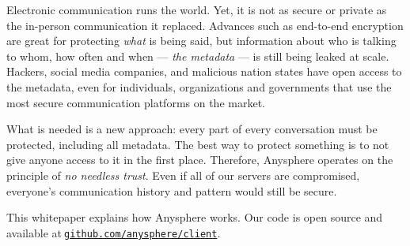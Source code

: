 



Electronic communication runs the world. Yet, it is not as secure or private as the in-person communication it replaced. Advances such as end-to-end encryption are great for protecting \textit{what} is being said, but information about who is talking to whom, how often and when — \textit{the metadata} — is still being leaked at scale. Hackers, social media companies, and malicious nation states have open access to the metadata, even for individuals, organizations and governments that use the most secure communication platforms on the market.



What is needed is a new approach: every part of every conversation must be protected, including all metadata. The best way to protect something is to not give anyone access to it in the first place. Therefore, Anysphere operates on the principle of \textit{no needless trust}. Even if all of our servers are compromised, everyone's communication history and pattern would still be secure.

This whitepaper explains how Anysphere works. Our code is open source and available at$~${\tt \href{https://github.com/anysphere/client}{github.com/anysphere/client}}.